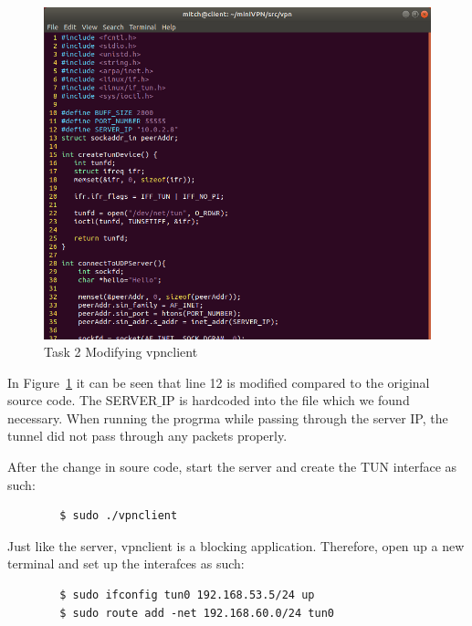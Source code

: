 \documentclass[12pt]{article}
\newcommand\tab[1][0.5cm]{\hspace*{#1}}
\begin{document}
    \begin{figure}[H]
        \begin{center}
            \includegraphics[scale=0.45]{t2_mody_vpnclient.png}
        \end{center}{}
        \caption{Task 2 Modifying vpnclient}
        \label{fig:t2_modify_vpnclient}
    \end{figure}

    \tab In Figure~\ref{fig:t2_modify_vpnclient} it can be seen that line 12 is modified compared to the original source code. The SERVER$\_$IP is hardcoded into the file which we found necessary. When running the progrma while passing through the server IP, the tunnel did not pass through any packets properly.

    After the change in soure code, start the server and create the TUN interface as such:
    \begin{verbatim}
        $ sudo ./vpnclient
    \end{verbatim}
    Just like the server, vpnclient is a blocking application. Therefore, open up a new terminal and set up the interafces as such:
    \begin{verbatim}
        $ sudo ifconfig tun0 192.168.53.5/24 up
        $ sudo route add -net 192.168.60.0/24 tun0
    \end{verbatim}
\end{document}
